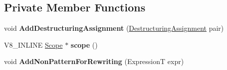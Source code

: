 \subsection*{Private Member Functions}
\begin{DoxyCompactItemize}
\item 
void {\bfseries Add\+Destructuring\+Assignment} (\hyperlink{structv8_1_1internal_1_1_parser_base_1_1_destructuring_assignment}{Destructuring\+Assignment} pair)\hypertarget{classv8_1_1internal_1_1_parser_base_1_1_b_a_s_e___e_m_b_e_d_d_e_d_ab2f9b239941c4e20740b91e82eaa1fb4}{}\label{classv8_1_1internal_1_1_parser_base_1_1_b_a_s_e___e_m_b_e_d_d_e_d_ab2f9b239941c4e20740b91e82eaa1fb4}

\item 
V8\+\_\+\+I\+N\+L\+I\+NE \hyperlink{classv8_1_1internal_1_1_scope}{Scope} $\ast$ {\bfseries scope} ()\hypertarget{classv8_1_1internal_1_1_parser_base_1_1_b_a_s_e___e_m_b_e_d_d_e_d_a4958311abb55b9123f1aa52fcb003056}{}\label{classv8_1_1internal_1_1_parser_base_1_1_b_a_s_e___e_m_b_e_d_d_e_d_a4958311abb55b9123f1aa52fcb003056}

\item 
void {\bfseries Add\+Non\+Pattern\+For\+Rewriting} (ExpressionT expr)\hypertarget{classv8_1_1internal_1_1_parser_base_1_1_b_a_s_e___e_m_b_e_d_d_e_d_ac00454071dea5ef9a1c9c44510f79b06}{}\label{classv8_1_1internal_1_1_parser_base_1_1_b_a_s_e___e_m_b_e_d_d_e_d_ac00454071dea5ef9a1c9c44510f79b06}

\end{DoxyCompactItemize}
